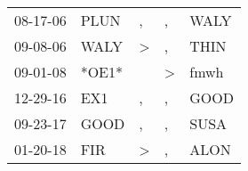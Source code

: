 \begin{supertabular}{lllll}
 08-17-06 &   PLUN &             , &             , &  WALY \\
 09-08-06 &   WALY &  \textgreater &             , &  THIN \\
 09-01-08 &  *OE1* &               &  \textgreater &  fmwh \\
 12-29-16 &    EX1 &             , &             , &  GOOD \\
 09-23-17 &   GOOD &             , &             , &  SUSA \\
 01-20-18 &    FIR &  \textgreater &             , &  ALON \\
\end{supertabular}
